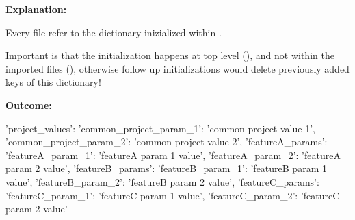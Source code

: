 \vspace{2ex}

\textbullet {}

\vspace{2ex}

\textbullet {}

\vspace{2ex}

\textbf{Explanation:}

\vspace{2ex}

Every  file refer to the dictionary inizialized within .

Important is that the initialization  happens at top level (),
and not within the imported files (), otherwise follow up initializations would delete
previously added keys of this dictionary!

\vspace{2ex}

\textbf{Outcome:}

\vspace{2ex}

\begin{pythonlog}
{'project_values': {'common_project_param_1': 'common project value 1',
                    'common_project_param_2': 'common project value 2',
                    'featureA_params': {'featureA_param_1': 'featureA param 1 value',
                                        'featureA_param_2': 'featureA param 2 value'},
                    'featureB_params': {'featureB_param_1': 'featureB param 1 value',
                                        'featureB_param_2': 'featureB param 2 value'},
                    'featureC_params': {'featureC_param_1': 'featureC param 1 value',
                                        'featureC_param_2': 'featureC param 2 value'}}}
\end{pythonlog}

